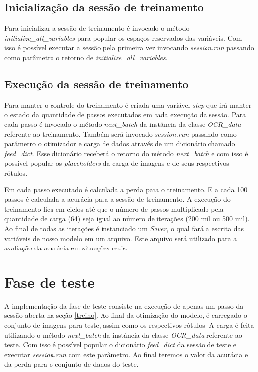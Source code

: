 \subsection{Inicialização da sessão de treinamento}

Para inicializar a sessão de treinamento é invocado o método
\textit{initialize\_all\_variables} para popular os espaços reservados
das variáveis. Com isso é possível executar a sessão pela primeira vez
invocando \textit{session.run} passando como parâmetro o retorno de
\textit{initialize\_all\_variables}.

\subsection{Execução da sessão de treinamento}

Para manter o controle do treinamento é criada uma variável
\textit{step} que irá manter o estado da quantidade de passos
executados em cada execução da sessão. Para cada passo é invocado o
método \textit{next\_batch} da instância da classe \textit{OCR\_data}
referente ao treinamento. Também será invocado \textit{session.run}
passando como parâmetro o otimizador e carga de dados através de um
dicionário chamado \textit{feed\_dict}. Esse dicionário receberá o
retorno do método \textit{next\_batch} e com isso é possível popular
os \textit{placeholders} da carga de imagens e de seus respectivos
rótulos.

Em cada passo executado é calculada a perda para o treinamento. E a
cada 100 passos é calculada a acurácia para a sessão de treinamento. A
execução do treinamento fica em ciclos até que o número de passos
multiplicado pela quantidade de carga (64) seja igual ao número de
iterações (200 mil ou 500 mil). Ao final de todas as iterações é
instanciado um \textit{Saver}, o qual fará a escrita das variáveis de
nosso modelo em um arquivo. Este arquivo será utilizado para a
avaliação da acurácia em situações reais.

\section{Fase de teste} \label{faseTeste}

A implementação da fase de teste consiste na execução de apenas um
passo da sessão aberta na seção \ref{treino}. Ao final da otimização
do modelo, é carregado o conjunto de imagens para teste, assim como os
respectivos rótulos. A carga é feita utilizando o método
\textit{next\_batch} da instância da classe \textit{OCR\_data}
referente ao teste. Com isso é possível popular o dicionário
\textit{feed\_dict} da sessão de teste e executar \textit{session.run}
com este parâmetro. Ao final teremos o valor da acurácia e da perda
para o conjunto de dados do teste.

